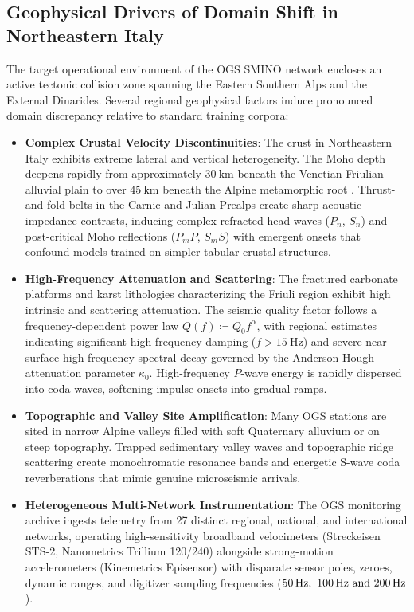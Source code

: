 \subsection{Geophysical Drivers of Domain Shift in Northeastern Italy}
\label{subsec:geophysical_drivers}

The target operational environment of the \ac{OGS} \ac{SMINO} network encloses
an active tectonic collision zone spanning the Eastern Southern Alps and the
External Dinarides. Several regional geophysical factors induce pronounced
domain discrepancy relative to standard training corpora:

\begin{itemize}
  \item \textbf{Complex Crustal Velocity Discontinuities}: The crust in
    Northeastern Italy exhibits extreme lateral and vertical heterogeneity.
    The Moho depth deepens rapidly from approximately
    $\qty{30}{\kilo\meter}$ beneath
    the Venetian-Friulian alluvial plain to over
    $\qty{45}{\kilo\meter}$ beneath the
    Alpine metamorphic root \parencite{Bressan1998}. Thrust-and-fold
    belts in the
    Carnic and Julian Prealps create sharp acoustic impedance contrasts,
    inducing complex refracted head waves ($P_n$, $S_n$) and post-critical
    Moho reflections ($P_mP$, $S_mS$) with emergent onsets that confound models
    trained on simpler tabular crustal structures.
  \item \textbf{High-Frequency Attenuation and Scattering}: The fractured
    carbonate platforms and karst lithologies characterizing the Friuli region
    exhibit high intrinsic and scattering attenuation. The seismic
    quality factor
    follows a frequency-dependent power law $Q(f) \coloneqq Q_0 f^\alpha$,
    with regional
    estimates indicating significant high-frequency damping ($f >
    \qty{15}{\hertz}$)
    and severe near-surface high-frequency spectral decay governed by the
    Anderson-Hough attenuation parameter $\kappa_0$. High-frequency $P$-wave
    energy is rapidly dispersed into coda waves, softening impulse onsets into
    gradual ramps.
  \item \textbf{Topographic and Valley Site Amplification}: Many \ac{OGS}
    stations are sited in narrow Alpine valleys filled with soft Quaternary
    alluvium or on
    steep topography. Trapped sedimentary valley waves and topographic ridge
    scattering create monochromatic resonance bands and energetic S-wave coda
    reverberations that mimic genuine microseismic arrivals.
  \item \textbf{Heterogeneous Multi-Network Instrumentation}: The
    \ac{OGS} monitoring
    archive ingests telemetry from \num{27} distinct regional, national, and
    international networks,
    operating high-sensitivity broadband velocimeters (Streckeisen
      STS-2, Nanometrics
    Trillium 120/240) alongside strong-motion accelerometers
    (Kinemetrics Episensor)
    with disparate sensor poles, zeroes, dynamic ranges, and digitizer sampling
    frequencies ($\qtylist{50; 100; 200}{\hertz}$).
\end{itemize}

